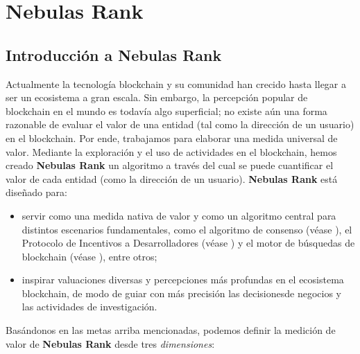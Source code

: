 \section{Nebulas Rank}
\label{sec:rank}

\subsection{Introducción a Nebulas Rank} \label{subsec:value}
Actualmente la tecnología blockchain y su comunidad han crecido hasta llegar a ser un ecosistema a gran escala. Sin embargo, la percepción popular de blockchain en el mundo es todavía algo superficial; no existe aún una forma razonable de evaluar el valor de una entidad (tal como la dirección de un usuario) en el blockchain. Por ende, trabajamos para elaborar una medida universal de valor. Mediante la exploración y el uso de actividades en el blockchain, hemos creado \textbf{Nebulas Rank} un algoritmo a través del cual se puede cuantificar el valor de cada entidad (como la dirección de un usuario). \textbf{Nebulas Rank} está diseñado para:\begin{itemize}
	\item servir como una medida nativa de valor y como un algoritmo central para distintos escenarios fundamentales, como el algoritmo de consenso (véase ), el Protocolo de Incentivos a Desarrolladores (véase ) y el motor de búsquedas de blockchain (véase ), entre otros;
	\item inspirar valuaciones diversas y percepciones más profundas en el ecosistema blockchain, de modo de guiar con más precisión las decisionesde negocios y las actividades de investigación.
\end{itemize}
Basándonos en las metas arriba mencionadas, podemos definir la medición de valor de \textbf{Nebulas Rank} desde tres \textit{dimensiones}:
